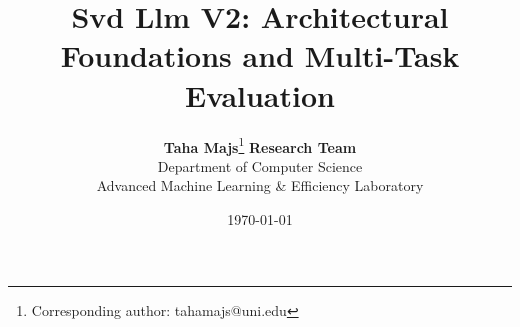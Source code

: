 \title{\textbf{Svd Llm V2: Architectural Foundations and Multi-Task Evaluation}}

\author{
  \textbf{Taha Majs}\thanks{Corresponding author: tahamajs@uni.edu} \quad \textbf{Research Team} \\
  Department of Computer Science \\
  Advanced Machine Learning \& Efficiency Laboratory
}

\date{\today}

